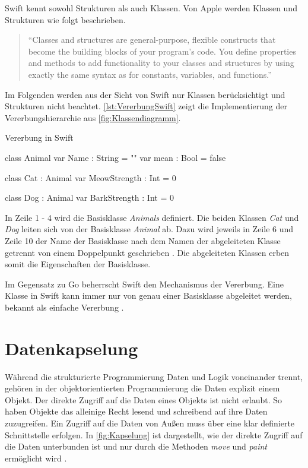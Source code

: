 Swift kennt sowohl Strukturen als auch Klassen. Von Apple werden Klassen und Strukturen wie folgt beschrieben. 
\begin{quote}
\enquote{Classes and structures are general-purpose, flexible constructs that become the building blocks of your program’s code. You define properties and methods to add functionality to your classes and
structures by using exactly the same syntax as for constants, variables, and functions.} \cite[S.183]{Apple.2017}
\end{quote}

Im Folgenden werden aus der Sicht von Swift nur Klassen berücksichtigt und Strukturen nicht beachtet.
\autoref{lst:VererbungSwift} zeigt die Implementierung der Vererbungshierarchie aus \autoref{fig:Klassendiagramm}.

\begin{listing}[H]
\caption{Vererbung in Swift}
\label{lst:VererbungSwift}
\begin{SwiftCode}
class Animal{
    var Name : String = ""
    var mean : Bool = false
}

class Cat : Animal{
    var MeowStrength : Int = 0
}

class Dog : Animal{
    var BarkStrength : Int = 0
}
\end{SwiftCode}
\end{listing}

In Zeile 1 - 4 wird die Basisklasse \emph{Animals} definiert. 
Die beiden Klassen \textit{Cat} und \textit{Dog} leiten sich von der Basisklasse \textit{Animal} ab. 
Dazu wird jeweils in Zeile 6 und Zeile 10 der Name der Basisklasse nach dem Namen der abgeleiteten Klasse getrennt von einem Doppelpunkt geschrieben \cite[S.226]{Apple.2017}.
Die abgeleiteten Klassen erben somit die Eigenschaften der Basisklasse. 

Im Gegensatz zu Go beherrscht Swift den Mechanismus der Vererbung.
Eine Klasse in Swift kann immer nur von genau einer Basisklasse abgeleitet werden, bekannt als einfache Vererbung \cite[S.125]{Hoffman.2017}.

\section{Datenkapselung}
Während die strukturierte Programmierung Daten und Logik voneinander trennt, gehören in der objektorientierten Programmierung die Daten explizit einem Objekt. 
Der direkte Zugriff auf die Daten eines Objekts ist nicht erlaubt. 
So haben Objekte das alleinige Recht lesend und schreibend auf ihre Daten zuzugreifen. 
Ein Zugriff auf die Daten von Außen muss über eine klar definierte Schnittstelle erfolgen.
In \autoref{fig:Kapselung} ist dargestellt, wie der direkte Zugriff auf die Daten unterbunden ist und nur durch die Methoden \emph{move} und \emph{paint} ermöglicht wird \cite[]{Lahres.2011}.

